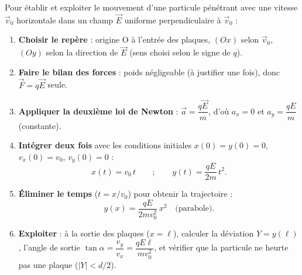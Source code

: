 \documentclass[11pt]{article}
\begin{document}
\begin{methode}
Pour établir et exploiter le mouvement d'une particule pénétrant avec une vitesse $\vec{v}_0$ horizontale dans un champ $\vec{E}$ uniforme perpendiculaire à $\vec{v}_0$ :
\begin{enumerate}
\item \textbf{Choisir le repère} : origine O à l'entrée des plaques, $(Ox)$ selon $\vec{v}_0$, $(Oy)$ selon la direction de $\vec{E}$ (sens choisi selon le signe de $q$).
\item \textbf{Faire le bilan des forces} : poids négligeable (à justifier une fois), donc $\vec{F}=q\vec{E}$ seule.
\item \textbf{Appliquer la deuxième loi de Newton} : $\vec{a}=\dfrac{q\vec{E}}{m}$, d'où $a_x=0$ et $a_y=\dfrac{qE}{m}$ (constante).
\item \textbf{Intégrer deux fois} avec les conditions initiales $x(0)=y(0)=0$, $v_x(0)=v_0$, $v_y(0)=0$ :
\[ x(t)=v_0\,t \qquad ; \qquad y(t)=\dfrac{qE}{2m}\,t^2. \]
\item \textbf{Éliminer le temps} ($t=x/v_0$) pour obtenir la trajectoire :
\[ y(x)=\dfrac{qE}{2mv_0^2}\,x^2 \quad\text{(parabole).} \]
\item \textbf{Exploiter} : à la sortie des plaques ($x=\ell$), calculer la déviation $Y=y(\ell)$, l'angle de sortie $\tan\alpha=\dfrac{v_y}{v_x}=\dfrac{qE\ell}{mv_0^2}$, et vérifier que la particule ne heurte pas une plaque ($|Y|<d/2$).
\end{enumerate}
\end{methode}
\end{document}
